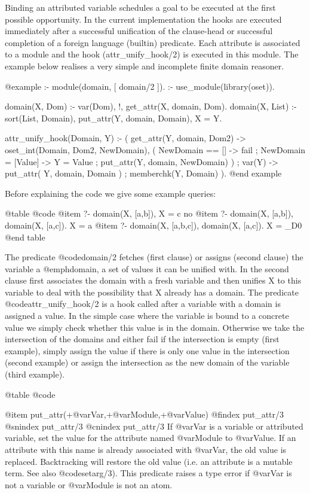 Binding an attributed variable schedules a goal to be executed at the
first possible opportunity. In the current implementation the hooks are
executed immediately after a successful unification of the clause-head
or successful completion of a foreign language (builtin) predicate. Each
attribute is associated to a module and the hook (attr_unify_hook/2) is
executed in this module.  The example below realises a very simple and
incomplete finite domain reasoner.

@example
:- module(domain,
	  [ domain/2			%
	  ]).
:- use_module(library(oset)).

domain(X, Dom) :-
	var(Dom), !,
	get_attr(X, domain, Dom).
domain(X, List) :-
	sort(List, Domain),
	put_attr(Y, domain, Domain),
	X = Y.


attr_unify_hook(Domain, Y) :-
	(   get_attr(Y, domain, Dom2)
	->  oset_int(Domain, Dom2, NewDomain),
	    (   NewDomain == []
	    ->	fail
	    ;	NewDomain = [Value]
	    ->	Y = Value
	    ;	put_attr(Y, domain, NewDomain)
	    )
	;   var(Y)
	->  put_attr( Y, domain, Domain )
	;   memberchk(Y, Domain)
	).
@end example


Before explaining the code we give some example queries:

@table @code
@item ?- domain(X, [a,b]), X = c		     
no
@item ?- domain(X, [a,b]), domain(X, [a,c]).   
      X = a
@item ?- domain(X, [a,b,c]), domain(X, [a,c]). 
  X = _D0
@end table

The predicate @code{domain/2} fetches (first clause) or assigns
(second clause) the variable a @emph{domain}, a set of values it can
be unified with.  In the second clause first associates the domain
with a fresh variable and then unifies X to this variable to deal
with the possibility that X already has a domain. The
predicate @code{attr_unify_hook/2} is a hook called after a variable with
a domain is assigned a value.  In the simple case where the variable
is bound to a concrete value we simply check whether this value is in
the domain. Otherwise we take the intersection of the domains and either
fail if the intersection is empty (first example), simply assign the
value if there is only one value in the intersection (second example) or
assign the intersection as the new domain of the variable (third
example).


@table @code

@item put_attr(+@var{Var},+@var{Module},+@var{Value})
@findex put_attr/3
@snindex put_attr/3
@cnindex put_attr/3
If @var{Var} is a variable or attributed variable, set the value for the
attribute named @var{Module} to @var{Value}. If an attribute with this
name is already associated with @var{Var}, the old value is replaced.
Backtracking will restore the old value (i.e. an attribute is a mutable
term. See also @code{setarg/3}). This predicate raises a type error if
@var{Var} is not a variable or @var{Module} is not an atom.

